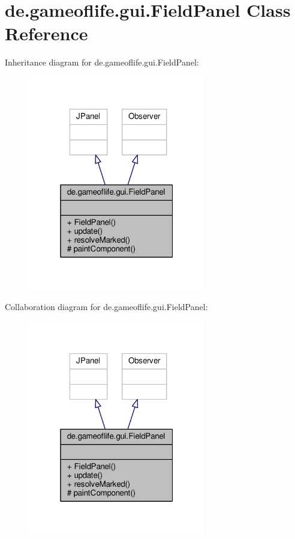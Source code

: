 \hypertarget{classde_1_1gameoflife_1_1gui_1_1FieldPanel}{\section{de.\-gameoflife.\-gui.\-Field\-Panel Class Reference}
\label{classde_1_1gameoflife_1_1gui_1_1FieldPanel}
}


Inheritance diagram for de.\-gameoflife.\-gui.\-Field\-Panel\-:\nopagebreak
\begin{figure}[H]
\begin{center}
\leavevmode
\includegraphics[width=220pt]{classde_1_1gameoflife_1_1gui_1_1FieldPanel__inherit__graph}
\end{center}
\end{figure}


Collaboration diagram for de.\-gameoflife.\-gui.\-Field\-Panel\-:\nopagebreak
\begin{figure}[H]
\begin{center}
\leavevmode
\includegraphics[width=220pt]{classde_1_1gameoflife_1_1gui_1_1FieldPanel__coll__graph}
\end{center}
\end{figure}

